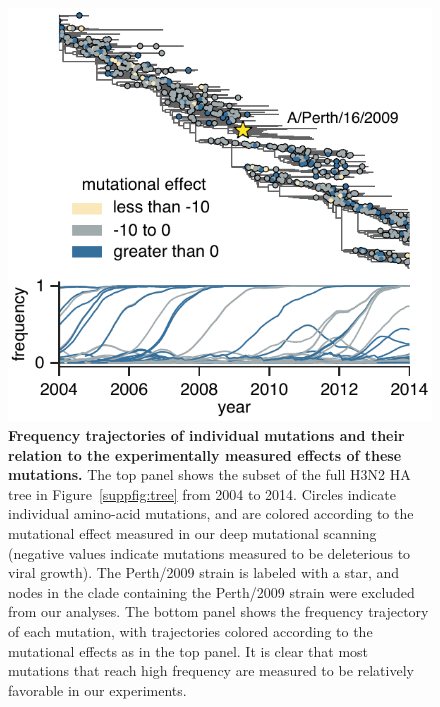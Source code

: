 \documentclass[9pt,twocolumn,twoside]{pnas-new}
\begin{document}
\begin{figure}[b!]
\centering
\includegraphics[width=0.95\linewidth]{figs/frequency_trajectory_ex/frequency_trajectory_ex.pdf}
\caption{\label{fig:frequency_trajectory}
{\bf Frequency trajectories of individual mutations and their relation to the experimentally measured effects of these mutations.}
The top panel shows the subset of the full H3N2 HA tree in Figure~\ref{suppfig:tree} from 2004 to 2014.
Circles indicate individual amino-acid mutations, and are colored according to the mutational effect measured in our deep mutational scanning (negative values indicate mutations measured to be deleterious to viral growth).
The Perth/2009 strain is labeled with a star, and nodes in the clade containing the Perth/2009 strain were excluded from our analyses.
The bottom panel shows the frequency trajectory of each mutation, with trajectories colored according to the mutational effects as in the top panel.
It is clear that most mutations that reach high frequency are measured to be relatively favorable in our experiments.
}
\end{figure}
\end{document}
